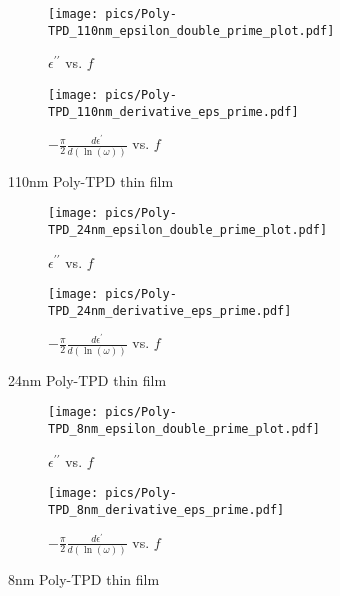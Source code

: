 \begin{figure}[!htb]
\centering
\begin{subfigure}[t]{.5\textwidth}
  \centering
  \texttt{[image: pics/Poly-TPD\_110nm\_epsilon\_double\_prime\_plot.pdf]}
  \caption{$\epsilon^{\prime\prime}$ vs. $f$}
  \label{fig:sub1}
\end{subfigure}%
\begin{subfigure}[t]{.5\textwidth}
  \centering
  \texttt{[image: pics/Poly-TPD\_110nm\_derivative\_eps\_prime.pdf]}
  \caption{$-\frac{\pi}{2}\frac{d\epsilon^{\prime}}{d\left(\ln \left( \omega \right)   \right) }$ vs. $f$}
\end{subfigure}
\caption{110nm Poly-TPD thin film}
  \label{110tpd}
\end{figure}

\begin{figure}[!htb]
\centering
\begin{subfigure}[t]{.5\textwidth}
  \centering
  \texttt{[image: pics/Poly-TPD\_24nm\_epsilon\_double\_prime\_plot.pdf]}
  \caption{$\epsilon^{\prime\prime}$ vs. $f$}
  \label{fig:sub1}
\end{subfigure}%
\begin{subfigure}[t]{.5\textwidth}
  \centering
  \texttt{[image: pics/Poly-TPD\_24nm\_derivative\_eps\_prime.pdf]}
  \caption{$-\frac{\pi}{2}\frac{d\epsilon^{\prime}}{d\left(\ln \left( \omega \right)   \right) }$ vs. $f$}
  \label{fig:sub2}
\end{subfigure}
\caption{24nm Poly-TPD thin film}
  \label{24tpd}
\end{figure}


\begin{figure}[!htb]
\centering
\begin{subfigure}[t]{.5\textwidth}
  \centering
  \texttt{[image: pics/Poly-TPD\_8nm\_epsilon\_double\_prime\_plot.pdf]}
  \caption{$\epsilon^{\prime\prime}$ vs. $f$}
  \label{fig:sub1}
\end{subfigure}%
\begin{subfigure}[t]{.5\textwidth}
  \centering
  \texttt{[image: pics/Poly-TPD\_8nm\_derivative\_eps\_prime.pdf]}
  \caption{$-\frac{\pi}{2}\frac{d\epsilon^{\prime}}{d\left(\ln \left( \omega \right)   \right) }$ vs. $f$}
  \label{fig:sub2}
\end{subfigure}
\caption{8nm Poly-TPD thin film}
  \label{8tpd}
\end{figure}


